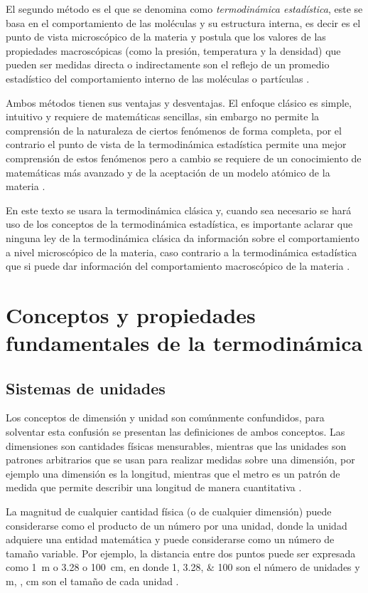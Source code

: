 \documentclass[../master.tex]{subfiles}
\begin{document}
El segundo método es el que se denomina como \emph{termodinámica estadística}, este se basa en el comportamiento de las moléculas y su estructura interna, es decir es el punto de vista microscópico de la materia y postula que los valores de las propiedades macroscópicas (como la presión, temperatura y la densidad) que pueden ser medidas directa o indirectamente son el reflejo de un promedio estadístico del comportamiento interno de las moléculas o partículas \parencites{faires}{wark}.

Ambos métodos tienen sus ventajas y desventajas. El enfoque clásico es simple, intuitivo y requiere de matemáticas sencillas, sin embargo no permite la comprensión de la naturaleza de ciertos fenómenos de forma completa, por el contrario el punto de vista de la termodinámica estadística permite una mejor comprensión de estos fenómenos pero a cambio se requiere de un conocimiento de matemáticas más avanzado y de la aceptación de un modelo atómico de la materia \parencite{faires}.

En este texto se usara la termodinámica clásica y, cuando sea necesario se hará uso de los conceptos de la termodinámica estadística, es importante aclarar que ninguna ley de la termodinámica clásica da información sobre el comportamiento a nivel microscópico de la materia, caso contrario a la termodinámica estadística que si puede dar información del comportamiento macroscópico de la materia \parencite{smith-vanness}.

\section{Conceptos y propiedades fundamentales de la termodinámica}

\subsection{Sistemas de unidades}

Los conceptos de dimensión y unidad son comúnmente confundidos, para solventar esta confusión se presentan las definiciones de ambos conceptos. Las dimensiones son cantidades físicas mensurables, mientras que las unidades son patrones arbitrarios que se usan para realizar medidas sobre una dimensión, por ejemplo una dimensión es la longitud, mientras que el metro es un patrón de medida que permite describir una longitud de manera cuantitativa \parencites{rubenstein}{doran}.


La magnitud de cualquier cantidad física (o de cualquier dimensión) puede considerarse como el producto de un número por una unidad, donde la unidad adquiere una entidad matemática y puede considerarse como un número de tamaño variable. Por ejemplo, la distancia entre dos puntos puede ser expresada como \qty{1}{\metre} o \qty{3.28}{\feet} o \qty{100}{\centi\metre}, en donde \numlist{1;3.28;100} son el número de unidades y \unit{m}, \unit{\feet}, \unit{\centi\metre} son el tamaño de cada unidad \parencite{coulson1}.
\end{document}
